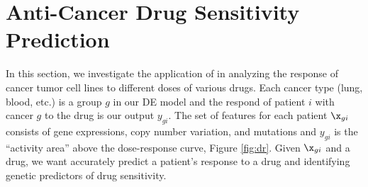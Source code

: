\section{Anti-Cancer Drug Sensitivity Prediction}
\label{realexp}
In this section, we investigate the application of \dc{} in analyzing the response of cancer tumor cell lines to different doses of various drugs. 
Each cancer type (lung, blood, etc.) is a group $g$ in our DE model and the respond of patient $i$ with cancer $g$ to the drug is our output $y_{gi}$. 
The set of features for each patient $\x_{gi}$ consists of gene expressions, copy number variation, and mutations and $y_{gi}$ is the ``activity area'' above the dose-response curve, Figure \ref{fig:dr}.
Given $\x_{gi}$ and a drug, we want accurately predict a patient's response to a drug and identifying genetic predictors of drug sensitivity. 
